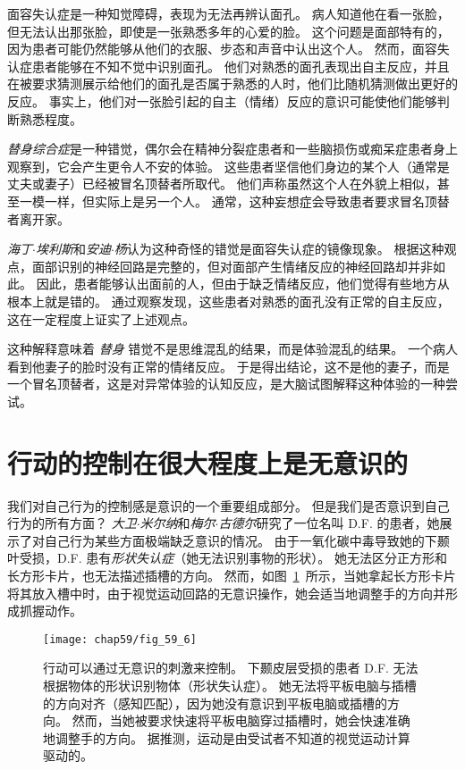 面容失认症是一种知觉障碍，表现为无法再辨认面孔。
病人知道他在看一张脸，但无法认出那张脸，即使是一张熟悉多年的心爱的脸。
这个问题是面部特有的，因为患者可能仍然能够从他们的衣服、步态和声音中认出这个人。
然而，面容失认症患者能够在不知不觉中识别面孔。
他们对熟悉的面孔表现出自主反应，并且在被要求猜测展示给他们的面孔是否属于熟悉的人时，他们比随机猜测做出更好的反应。
事实上，他们对一张脸引起的自主（情绪）反应的意识可能使他们能够判断熟悉程度。


\textit{替身综合症}是一种错觉，偶尔会在精神分裂症患者和一些脑损伤或痴呆症患者身上观察到，它会产生更令人不安的体验。
这些患者坚信他们身边的某个人（通常是丈夫或妻子）已经被冒名顶替者所取代。
他们声称虽然这个人在外貌上相似，甚至一模一样，但实际上是另一个人。
通常，这种妄想症会导致患者要求冒名顶替者离开家。


\textit{海丁$\cdot$埃利斯}和\textit{安迪$\cdot$杨}认为这种奇怪的错觉是面容失认症的镜像现象。
根据这种观点，面部识别的神经回路是完整的，但对面部产生情绪反应的神经回路却并非如此。
因此，患者能够认出面前的人，但由于缺乏情绪反应，他们觉得有些地方从根本上就是错的。
通过观察发现，这些患者对熟悉的面孔没有正常的自主反应，这在一定程度上证实了上述观点。

这种解释意味着 \textit{替身} 错觉不是思维混乱的结果，而是体验混乱的结果。
一个病人看到他妻子的脸时没有正常的情绪反应。
于是得出结论，这不是他的妻子，而是一个冒名顶替者，这是对异常体验的认知反应，是大脑试图解释这种体验的一种尝试。


\section{行动的控制在很大程度上是无意识的}

我们对自己行为的控制感是意识的一个重要组成部分。
但是我们是否意识到自己行为的所有方面？
\textit{大卫$\cdot$米尔纳}和\textit{梅尔$\cdot$古德尔}研究了一位名叫 D.F. 的患者，她展示了对自己行为某些方面极端缺乏意识的情况。
由于一氧化碳中毒导致她的下颞叶受损，D.F. 患有\textit{形状失认症}（她无法识别事物的形状）。
她无法区分正方形和长方形卡片，也无法描述插槽的方向。
然而，如图~\ref{fig:59_6}~所示，当她拿起长方形卡片将其放入槽中时，由于视觉运动回路的无意识操作，她会适当地调整手的方向并形成抓握动作。


\begin{figure}[htbp]
	\centering
	\texttt{[image: chap59/fig\_59\_6]}
	\caption{行动可以通过无意识的刺激来控制。
		下颞皮层受损的患者 D.F. 无法根据物体的形状识别物体（形状失认症）。
		她无法将平板电脑与插槽的方向对齐（感知匹配），因为她没有意识到平板电脑或插槽的方向。
		然而，当她被要求快速将平板电脑穿过插槽时，她会快速准确地调整手的方向。
		据推测，运动是由受试者不知道的视觉运动计算驱动的\cite{milner2006visual}。}
	\label{fig:59_6}
\end{figure}


